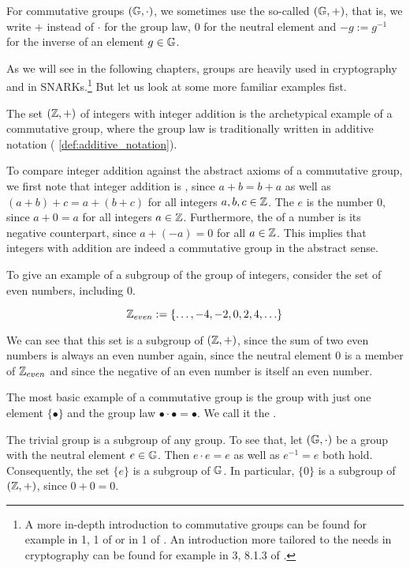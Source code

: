 \begin{notation}\label{def:additive_notation}
For commutative groups $(\mathbb{G},\cdot)$, we sometimes use the so-called  $(\mathbb{G},+)$, that is, we write $+$ instead of $\cdot$ for the group law, $0$ for the neutral element and $-g:=g^{-1}$ for the inverse of an element $g\in\mathbb{G}$.
\end{notation}
As we will see in the following chapters, groups are heavily used in cryptography and in SNARKs.\footnote{A more in-depth introduction to commutative groups can be found for example in \chaptname{} 1, \secname{} 1 of \cite{nieder-1986} or in \chaptname{} 1 of \cite{fuchs-2015}. An introduction more tailored to the needs in cryptography can be found for example in \chaptname{} 3, \secname{} 8.1.3 of \cite{katz-2007}.} But let us look at some more familiar examples fist.

\begin{example}
\label{example:group_of_integers}
The set $(\mathbb{Z},+)$ of integers with integer addition is the archetypical example of a commutative group, where the group law is traditionally written in additive notation (\notationname{} \ref{def:additive_notation}). 

To compare integer addition against the abstract axioms of a commutative group, we first note that integer addition is , since $a+b = b+a$ as well as $(a+b)+c=a+(b+c)$ for all integers $a,b,c\in \mathbb{Z}$. The  $e$ is the number $0$, since $a+0=a$ for all integers $a\in \mathbb{Z}$. Furthermore, the  of a number is its negative counterpart, since $a+(-a)=0$ for all $a\in\mathbb{Z}$. This implies that integers with addition are indeed a commutative group in the abstract sense.

To give an example of a subgroup of the group of integers, consider the set of even numbers, including $0$. 

$$\mathbb{Z}_{even}:=\{\ldots,-4,-2,0,2,4,\ldots\}$$

We can see that this set is a subgroup of $(\mathbb{Z},+)$, since the sum of two even numbers is always an even number again, since the neutral element $0$ is a member of $\mathbb{Z}_{even}$ and since the negative of an even number is itself an even number. 
\end{example}
\begin{example}\label{example:trivial_group}
The most basic example of a commutative group is the group with just one element $\{\bullet\}$ and the group law $\bullet\cdot \bullet=\bullet$. We call it the .

The trivial group is a subgroup of any group. To see that, let $(\mathbb{G},\cdot)$ be a group with the neutral element $e\in\mathbb{G}$. Then $e\cdot e = e$ as well as $e^{-1}=e$ both hold. Consequently, the set $\{e\}$ is a subgroup of $\mathbb{G}$. In particular, $\{0\}$ is a subgroup of $(\mathbb{Z},+)$, since $0+0=0$.
\end{example}

